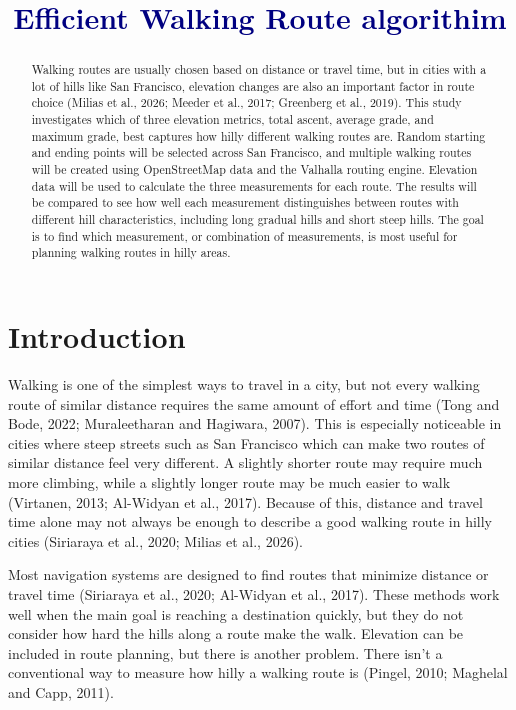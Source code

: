 \documentclass[11pt,letterpaper]{article}
\title{\textcolor{navy}{Efficient Walking Route algorithim}\\[5pt]\large}
\author{}
\date{}
\begin{document}
\maketitle
\begin{abstract}
Walking routes are usually chosen based on distance or travel time, but in cities with a lot of hills like San Francisco, elevation changes are also an important factor in route choice (Milias et al., 2026; Meeder et al., 2017; Greenberg et al., 2019). This study investigates which of three elevation metrics, total ascent, average grade, and maximum grade, best captures how hilly different walking routes are. Random starting and ending points will be selected across San Francisco, and multiple walking routes will be created using OpenStreetMap data and the Valhalla routing engine. Elevation data will be used to calculate the three measurements for each route. The results will be compared to see how well each measurement distinguishes between routes with different hill characteristics, including long gradual hills and short steep hills. The goal is to find which measurement, or combination of measurements, is most useful for planning walking routes in hilly areas.
\end{abstract}
\section{Introduction}
Walking is one of the simplest ways to travel in a city, but not every walking route of similar distance requires the same amount of effort and time (Tong and Bode, 2022; Muraleetharan and Hagiwara, 2007). This is especially noticeable in cities where steep streets such as San Francisco which can make two routes of similar distance feel very different. A slightly shorter route may require much more climbing, while a slightly longer route may be much easier to walk (Virtanen, 2013; Al-Widyan et al., 2017). Because of this, distance and travel time alone may not always be enough to describe a good walking route in hilly cities (Siriaraya et al., 2020; Milias et al., 2026).

Most navigation systems are designed to find routes that minimize distance or travel time (Siriaraya et al., 2020; Al-Widyan et al., 2017). These methods work well when the main goal is reaching a destination quickly, but they do not consider how hard the hills along a route make the walk. Elevation can be included in route planning, but there is another problem. There isn't a conventional way to measure how hilly a walking route is (Pingel, 2010; Maghelal and Capp, 2011).
\end{document}
